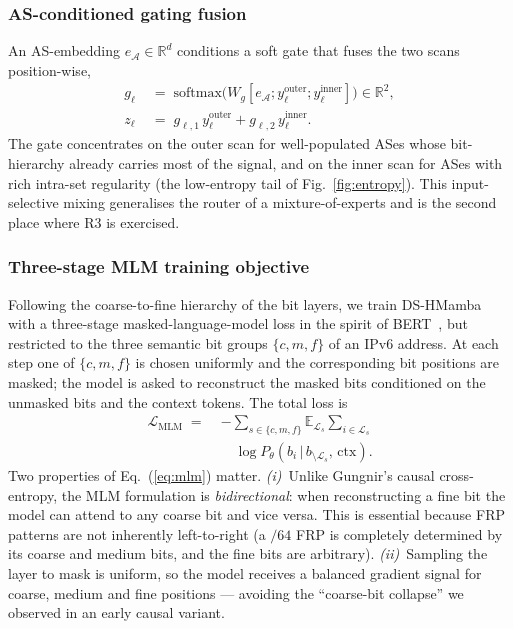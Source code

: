 \documentclass[conference]{IEEEtran}
\begin{document}
\subsubsection{AS-conditioned gating fusion}
An AS-embedding $e_{\mathcal{A}}\!\in\!\mathbb{R}^{d}$
conditions a soft gate that fuses the two scans position-wise,
\begin{equation}
\begin{aligned}
g_{\ell} \;&=\; \mathrm{softmax}\!\bigl(W_g[e_{\mathcal{A}};
   y^{\text{outer}}_{\ell};y^{\text{inner}}_{\ell}]\bigr)
   \in\mathbb{R}^{2},\\
z_{\ell} \;&=\; g_{\ell,1}\,y^{\text{outer}}_{\ell}
             + g_{\ell,2}\,y^{\text{inner}}_{\ell}.
\end{aligned}
\label{eq:gate}
\end{equation}
The gate concentrates on the outer scan for well-populated ASes
whose bit-hierarchy already carries most of the signal, and on
the inner scan for ASes with rich intra-set regularity (the
low-entropy tail of Fig.~\ref{fig:entropy}).  This
input-selective mixing generalises the router of a
mixture-of-experts and is the second place where R3 is
exercised.

\subsubsection{Three-stage MLM training objective}
Following the coarse-to-fine hierarchy of the bit layers, we
train DS-HMamba with a three-stage masked-language-model loss
in the spirit of BERT~\cite{devlin2019bert}, but restricted to
the three semantic bit groups $\{c,m,f\}$ of an IPv6 address.
At each step one of $\{c,m,f\}$ is chosen uniformly and the
corresponding bit positions are masked; the model is asked to
reconstruct the masked bits conditioned on the unmasked bits
and the context tokens.  The total loss is
\begin{equation}
\begin{split}
\mathcal{L}_{\mathrm{MLM}}
\;=\;& -\!\!\sum_{s\in\{c,m,f\}}\!
   \mathbb{E}_{\mathcal{L}_s}\!\!\sum_{i\in\mathcal{L}_s}\\
&\quad
\log P_\theta\!\left(b_i \,\big|\, b_{\setminus \mathcal{L}_s},\,\text{ctx}\right).
\end{split}
\label{eq:mlm}
\end{equation}
Two properties of Eq.~(\ref{eq:mlm}) matter.
\emph{(i)}~Unlike Gungnir's causal cross-entropy, the MLM
formulation is \emph{bidirectional}: when reconstructing a fine
bit the model can attend to any coarse bit and vice versa.
This is essential because FRP patterns are not inherently
left-to-right (a $/64$ FRP is completely determined by its
coarse and medium bits, and the fine bits are arbitrary).
\emph{(ii)}~Sampling the layer to mask is uniform, so the model
receives a balanced gradient signal for coarse, medium and fine
positions --- avoiding the ``coarse-bit collapse'' we observed
in an early causal variant.
\end{document}
